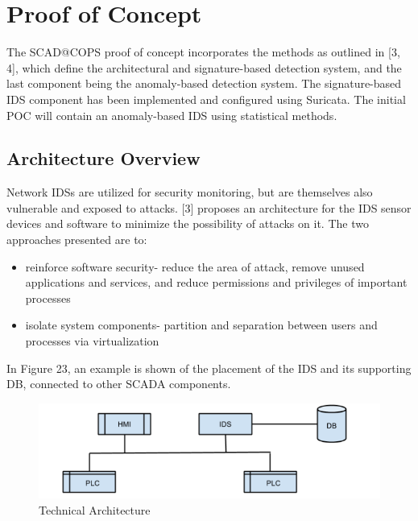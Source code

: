 \documentclass[11pt,]{article}
\begin{document}
\clearpage

\section{Proof of Concept}\label{proof-of-concept}

The SCAD@COPS proof of concept incorporates the methods as outlined in
{[}3, 4{]}, which define the architectural and signature-based detection
system, and the last component being the anomaly-based detection system.
The signature-based IDS component has been implemented and configured
using Suricata. The initial POC will contain an anomaly-based IDS using
statistical methods.

\subsection{Architecture Overview}\label{architecture-overview}

Network IDSs are utilized for security monitoring, but are themselves
also vulnerable and exposed to attacks. {[}3{]} proposes an architecture
for the IDS sensor devices and software to minimize the possibility of
attacks on it. The two approaches presented are to:

\begin{itemize}
\itemsep1pt\parskip0pt
\item
  reinforce software security- reduce the area of attack, remove unused
  applications and services, and reduce permissions and privileges of
  important processes
\item
  isolate system components- partition and separation between users and
  processes via virtualization
\end{itemize}

In Figure 23, an example is shown of the placement of the IDS and its
supporting DB, connected to other SCADA components.

\begin{figure}[bottom]

{\centering \includegraphics{thesis_files/figure-latex/unnamed-chunk-34-1} 

}

\caption{Technical Architecture}\label{fig:unnamed-chunk-34}
\end{figure}
\end{document}
